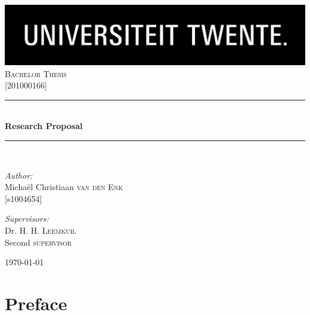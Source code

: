 \documentclass[12pt]{report} %
\newcommand{\HRule}{\rule{\linewidth}{0.5mm}}
\begin{document}
\begin{titlepage}

\begin{center}


\includegraphics[width=1\textwidth]{./logo}\\[1cm]    

\textsc{\Large Bachelor Thesis}\\[0.5cm]
\textsc{\Large {[}201000166{]}}\\[0.5cm]


\HRule \\[0.4cm]
{ \huge \bfseries Research Proposal}\\[0.4cm]

\HRule \\[1.5cm]

\begin{minipage}{0.4\textwidth}
\begin{flushleft} \large
\emph{Author:}\\
Michaël Christiaan \textsc{van den Enk} \\
{[}s1004654{]} \\
\end{flushleft}
\end{minipage}
\begin{minipage}{0.4\textwidth}
\begin{flushright} \large
\emph{Supervisors:} \\
Dr. H. H. \textsc{Leemkuil} \\
Second \textsc{supervisor} \\
\end{flushright}
\end{minipage}

\vfill

{\large \today}

\end{center}

\end{titlepage}

\setcounter{tocdepth}{1}
\tableofcontents

\chapter{Preface}
\end{document}

